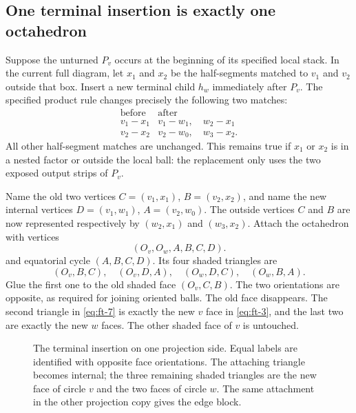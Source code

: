 \subsection{One terminal insertion is exactly one octahedron}\label{sec:ft-3}

Suppose the unturned \(P_v\) occurs at the beginning of its specified local stack. In the current full diagram, let \(x_1\) and \(x_2\) be the half-segments matched to \(v_1\) and \(v_2\) outside that box. Insert a new terminal child \(h_w\) immediately after \(P_v\). The specified product rule changes precisely the following two matches:
\begin{equation}
\begin{array}{c|c}
 \text{before}&\text{after}\\ \hline
 v_1\! -\! x_1&v_1\! -\! w_1,\quad w_2\! -\! x_1\\
 v_2\! -\! x_2&v_2\! -\! w_0,\quad w_3\! -\! x_2.
 \end{array}
\label{eq:ft-5}
\end{equation}
All other half-segment matches are unchanged. This remains true if \(x_1\) or \(x_2\) is in a nested factor or outside the local ball: the replacement only uses the two exposed output strips of \(P_v\).

Name the old two vertices \(C=(v_1,x_1)\), \(B=(v_2,x_2)\), and name the new internal vertices \(D=(v_1,w_1)\), \(A=(v_2,w_0)\). The outside vertices \(C\) and \(B\) are now represented respectively by \((w_2,x_1)\) and \((w_3,x_2)\). Attach the octahedron with vertices
\begin{equation}
(O_v,O_w,A,B,C,D).
\label{eq:ft-6}
\end{equation}
and equatorial cycle \((A,B,C,D)\). Its four shaded triangles are
\begin{equation}
(O_v,B,C),\quad (O_v,D,A),\quad
 (O_w,D,C),\quad (O_w,B,A).
\label{eq:ft-7}
\end{equation}
Glue the first one to the old shaded face \((O_v,C,B)\). The two orientations are opposite, as required for joining oriented balls. The old face disappears. The second triangle in \eqref{eq:ft-7} is exactly the new \(v\) face in \eqref{eq:ft-3}, and the last two are exactly the new \(w\) faces. The other shaded face of \(v\) is untouched.

\begin{figure}[htbp]
\centering

\caption{The terminal insertion on one projection side. Equal labels
are identified with opposite face orientations. The attaching
triangle becomes internal; the three remaining shaded triangles are
the new face of circle \(v\) and the two faces of circle \(w\).
The same attachment in the other projection copy gives the edge block.}
\label{fig:ordered-octahedral-attachment}
\end{figure}

